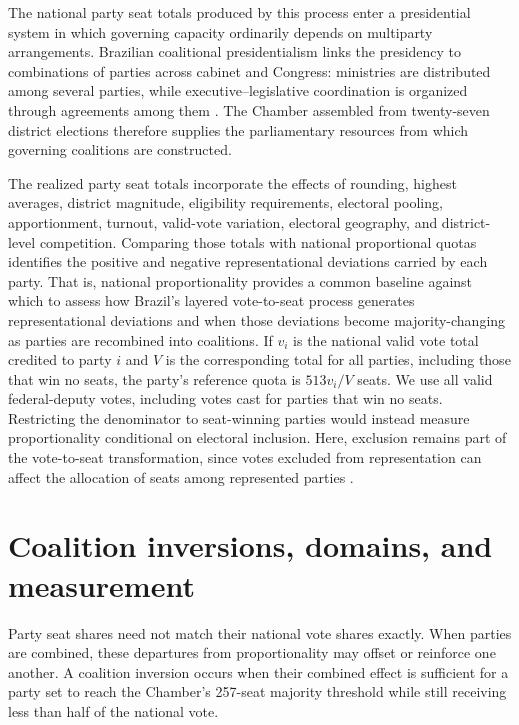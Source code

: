 \documentclass[11pt]{article}
\begin{document}
The national party seat totals produced by this process enter a presidential
system in which governing capacity ordinarily depends on multiparty
arrangements. Brazilian coalitional presidentialism links the presidency to
combinations of parties across cabinet and Congress: ministries are distributed
among several parties, while executive--legislative coordination is organized
through agreements among them
\parencite{abranches1988presidencialismo,figueiredo2000presidential}.
The Chamber assembled from twenty-seven district elections therefore supplies
the parliamentary resources from which governing coalitions are constructed.


The realized party seat totals incorporate the effects of rounding, highest
averages, district magnitude, eligibility requirements, electoral pooling,
apportionment, turnout, valid-vote variation, electoral geography, and
district-level competition. Comparing those totals with national proportional
quotas identifies the positive and negative representational deviations carried
by each party. That is, national proportionality provides a common baseline
against which to assess how Brazil’s layered vote-to-seat process generates
representational deviations and when those deviations become majority-changing
as parties are recombined into coalitions. If \(v_i\) is the national valid vote
total credited to party \(i\) and \(V\) is the corresponding total for all
parties, including those that win no seats, the party's reference quota is
\(513v_i/V\) seats. We use all valid federal-deputy votes, including votes cast
for parties that win no seats. Restricting the denominator to seat-winning
parties would instead measure proportionality conditional on electoral
inclusion. Here, exclusion remains part of the vote-to-seat transformation,
since votes excluded from representation can affect the allocation of seats
among represented parties
\parencite{kaminski18_spoil_effec_propor_repres_system}.


\section{Coalition inversions, domains, and measurement}
\label{sec:mea}


Party seat shares need not match their national vote shares exactly. When
parties are combined, these departures from proportionality may offset or
reinforce one another. A coalition inversion occurs when their combined effect
is sufficient for a party set to reach the Chamber's 257-seat majority threshold
while still receiving less than half of the national vote.
\end{document}
